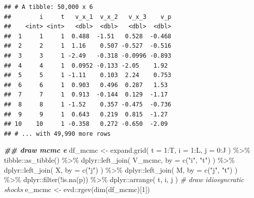 \documentclass[
]{book}
\newenvironment{Shaded}{\begin{snugshade}}{\end{snugshade}}
\newcommand{\AttributeTok}[1]{\textcolor[rgb]{0.77,0.63,0.00}{#1}}
\newcommand{\CommentTok}[1]{\textcolor[rgb]{0.56,0.35,0.01}{\textit{#1}}}
\newcommand{\DecValTok}[1]{\textcolor[rgb]{0.00,0.00,0.81}{#1}}
\newcommand{\DocumentationTok}[1]{\textcolor[rgb]{0.56,0.35,0.01}{\textbf{\textit{#1}}}}
\newcommand{\FunctionTok}[1]{\textcolor[rgb]{0.00,0.00,0.00}{#1}}
\newcommand{\NormalTok}[1]{#1}
\newcommand{\OtherTok}[1]{\textcolor[rgb]{0.56,0.35,0.01}{#1}}
\newcommand{\SpecialCharTok}[1]{\textcolor[rgb]{0.00,0.00,0.00}{#1}}
\newcommand{\StringTok}[1]{\textcolor[rgb]{0.31,0.60,0.02}{#1}}
\begin{document}
\begin{verbatim}
## # A tibble: 50,000 x 6
##        i     t   v_x_1  v_x_2   v_x_3    v_p
##    <int> <int>   <dbl>  <dbl>   <dbl>  <dbl>
##  1     1     1  0.488  -1.51   0.528  -0.468
##  2     2     1  1.16    0.507 -0.527  -0.516
##  3     3     1 -2.49   -0.318 -0.0996 -0.893
##  4     4     1  0.0952 -0.133 -2.05    1.92 
##  5     5     1 -1.11    0.103  2.24    0.753
##  6     6     1  0.903   0.496  0.287   1.53 
##  7     7     1  0.913  -0.144  0.129  -1.17 
##  8     8     1 -1.52    0.357 -0.475  -0.736
##  9     9     1  0.643   0.219  0.815  -1.27 
## 10    10     1 -0.358   0.272 -0.650  -2.09 
## # ... with 49,990 more rows
\end{verbatim}

\begin{Shaded}
\begin{Highlighting}[]
\DocumentationTok{\#\# draw mcmc e}
\NormalTok{df\_mcmc }\OtherTok{\textless{}{-}} 
  \FunctionTok{expand.grid}\NormalTok{(}
    \AttributeTok{t =} \DecValTok{1}\SpecialCharTok{:}\NormalTok{T, }
    \AttributeTok{i =} \DecValTok{1}\SpecialCharTok{:}\NormalTok{L, }
    \AttributeTok{j =} \DecValTok{0}\SpecialCharTok{:}\NormalTok{J}
\NormalTok{    ) }\SpecialCharTok{\%\textgreater{}\%}
\NormalTok{    tibble}\SpecialCharTok{::}\FunctionTok{as\_tibble}\NormalTok{() }\SpecialCharTok{\%\textgreater{}\%}
\NormalTok{    dplyr}\SpecialCharTok{::}\FunctionTok{left\_join}\NormalTok{(}
\NormalTok{      V\_mcmc, }
      \AttributeTok{by =} \FunctionTok{c}\NormalTok{(}\StringTok{"i"}\NormalTok{, }\StringTok{"t"}\NormalTok{)}
\NormalTok{      ) }\SpecialCharTok{\%\textgreater{}\%}
\NormalTok{    dplyr}\SpecialCharTok{::}\FunctionTok{left\_join}\NormalTok{(}
\NormalTok{      X, }
      \AttributeTok{by =} \FunctionTok{c}\NormalTok{(}\StringTok{"j"}\NormalTok{)}
\NormalTok{      ) }\SpecialCharTok{\%\textgreater{}\%}
\NormalTok{    dplyr}\SpecialCharTok{::}\FunctionTok{left\_join}\NormalTok{(}
\NormalTok{      M, }
      \AttributeTok{by =} \FunctionTok{c}\NormalTok{(}\StringTok{"j"}\NormalTok{, }\StringTok{"t"}\NormalTok{)}
\NormalTok{      ) }\SpecialCharTok{\%\textgreater{}\%}
\NormalTok{    dplyr}\SpecialCharTok{::}\FunctionTok{filter}\NormalTok{(}\SpecialCharTok{!}\FunctionTok{is.na}\NormalTok{(p)) }\SpecialCharTok{\%\textgreater{}\%}
\NormalTok{    dplyr}\SpecialCharTok{::}\FunctionTok{arrange}\NormalTok{(}
\NormalTok{      t, }
\NormalTok{      i, }
\NormalTok{      j}
\NormalTok{      )}
\CommentTok{\# draw idiosyncratic shocks}
\NormalTok{e\_mcmc }\OtherTok{\textless{}{-}}\NormalTok{ evd}\SpecialCharTok{::}\FunctionTok{rgev}\NormalTok{(}\FunctionTok{dim}\NormalTok{(df\_mcmc)[}\DecValTok{1}\NormalTok{])}
\end{Highlighting}
\end{Shaded}
\end{document}
